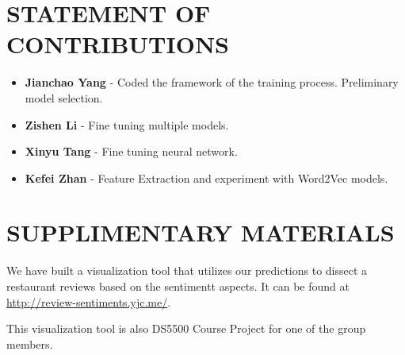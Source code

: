 \documentclass[compsoc]{IEEEtran}
\begin{document}


\newpage

\section*{STATEMENT OF CONTRIBUTIONS}

\begin{itemize}
\item \textbf{Jianchao Yang} - Coded the framework of the training process. Preliminary model selection.
\item \textbf{Zishen Li} - Fine tuning multiple models.
\item \textbf{Xinyu Tang} - Fine tuning neural network.
\item \textbf{Kefei Zhan} - Feature Extraction and experiment with Word2Vec models.
\end{itemize}

\section*{SUPPLIMENTARY MATERIALS}

We have built a visualization tool that utilizes our predictions to dissect a restaurant reviews based on the sentimentt aspects. It can be found at \url{http://review-sentiments.yjc.me/}.

This visualization tool is also DS5500 Course Project for one of the group members.
\end{document}
